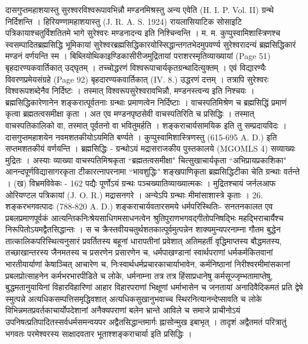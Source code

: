 दासगुप्तमहाशयास्तु सुरश्वरविश्वरूपावभिन्नौ मण्डनमिश्रस्तु अन्य एवेति (H. I. P. Vol. II) ग्रन्थे निर्दिशन्ति । हिरियण्णामहाशयास्तु (J. R. A. S. 1924) रायलासियाटिक सोसाइटि पत्रिकायाश्चतुर्विशतितमे भागे सुरेश्वरः मण्डनादन्य इति निश्चिन्वन्ति । म. म. कुप्पुस्वामिशास्त्रिणश्च स्वसम्पादितब्रह्मसिद्धि भूमिकायां सुरेश्वरब्रह्मसिद्धिकारयोस्सिद्धान्तगतभेदमुपवर्ण्य सुरेश्वरादन्यं ब्रह्मसिद्धिकारं मण्डनं वर्णयन्ति स्म ।
बिब्लियोथिकाइण्डिकासीरीजमुद्रितायां पराशरस्मृतिव्याख्यायां (Page 51) बृहदारण्यकवार्तिकात् उद्घृतम् । तच्चोद्धरणं विश्वरूपाचार्यकृतग्रन्थादित्युक्तम् । एवं विद्यारण्यैः विवरणप्रमेयसंग्रहे (Page 92) बृहदारण्यकवार्तिकात् (IV. 8.) उद्धरणं दत्तम् । तत्रापि सुरेश्वरः विश्वरूपशब्देनैव निर्दिष्टः । तस्मात् विश्वरूपसुरेश्वरावभिन्नौ, मण्डनस्त्वन्य इति निश्चयः ।
ब्रह्मसिद्धिकारेणानेन शङ्करात्पूर्वतनाः ग्रन्थाः प्रमाणत्वेन निर्दिष्टाः । वाचस्पतिमिश्रेण च ब्रह्मसिद्धिं प्रमाणं कृत्वा ब्रह्मतत्वसमीक्षा कृता । अत एव मण्डनपृष्ठसेवी वाचस्पतिरिति च प्रसिद्धिः । तस्मात् वाचस्पतिकालिको वा, तस्मात् पूर्वतनो वा भवितुमर्हति । शङ्कराचार्यसामयिक इति तु सम्प्रदायविदः । दासगुप्तमहाशयेन नवमशतकीयोऽयमिति बर्ण्यते । कुप्पुस्वामिशास्त्रिणस्तु (615-695 A. D.) इति सप्तमशतकीयं वर्णयन्ति ।
ब्रह्मसिद्धिः - ग्रन्थोऽयं मद्रासराजकीय पुस्तकालये (MGOMLS 4) सव्याख्यः मुद्रितः । अस्याः व्याख्या वाचस्पतिमिश्रकृता ``ब्रह्मतत्वसमीक्षा" चित्सुखाचार्यकृता ``अभिप्रायप्रकाशिका" आनन्दपूर्णविद्यासागरकृता टीकारत्नापरनामा ``भावशुद्धिः" शङ्खपाणिकृता ब्रह्मसिद्धिटीका चेति ग्रन्थाः वर्तन्ते ।
(ख) विभ्रमविवेकः - 162 पद्यैः पूर्णोऽयं ग्रन्थः पञ्चख्यातिव्याख्यात्मकः । मुद्रितश्चायं जर्नलआफ ओरियण्टल पत्रिकायां (J. O. R.) मद्रासनगरे । अन्येऽपि ग्रन्थाः मीमांसाशास्त्रे कृताः ।
26. शङ्करभगवत्पादः (788-820 A. D.)
शङ्कराचार्यवतारसमये धर्मपरिस्थितिः-
सनतनकालत एव प्रबलप्रमाणपूर्वकं आत्यन्तिकनिःश्रेयसाधिगमसाधनत्वेन श्रुतिपुराणभगवद्गीतोपनिषद्भिः महद्भिराचार्यैश्च निरूपितोऽयमद्वैतसिद्धान्तः । स च क्रैस्तवीयचतुर्थशतकात्पूर्वमुत्पन्नेन शाक्यमुन्यपरनाम्ना गौतम बुद्धेन तात्कालिकपरिस्थित्यनुसारं प्रवर्तितस्य बहूनां धारापतीनां प्रवेशात् अतिमहर्ती वृद्धिमाप्तस्य बौद्धमतस्य, तच्छाखान्तरस्य जैनमतस्य च प्रसरणेन प्रसारणेन च, धर्मपाखण्डानां स्वार्थपराणां धर्मकर्मकितवानां भारतीयार्याणां केषाञ्चित् आचारेण च, निःस्वार्थधर्मप्रचारकाचार्याभावेन, कर्मनिष्ठानां निरीश्वरमीमांसकानां प्रबलप्रोत्साहनेन कर्मभरभारपीडिते च लोके, धर्मनाम्ना तत्र तत्र हिंसाप्रधानेषु कर्मसूज्जृम्भतामाप्तेषु, बुद्धमतानुयायिनां विहारविहारिणां आहार विहारपराणां भिक्षूणां धर्माभासेन च जनतायां अनादिवैदिकमतं प्रति द्वेषे स्मुत्पन्ने अत्यधिकसम्पत्तिसमृद्धिवशात् अत्यधिकसुखानुभवाच्च स्थिरनित्यानन्देप्सावति च लोके विभिन्नमतप्रवर्तकाचार्योपदेशानां अनैक्यपराणां बलेन भ्रान्ते आविले च समाजे प्राचीनोऽयं उपनिषत्प्रतिपादितस्सर्वधर्मसमन्वयपर अद्वैतसिद्धान्तमार्गः ह्नासोन्मुख इबाभृत् । तादृशं अद्वैतमतं परित्रातुं भगवतः परमेश्वरस्य साक्षादवतार भूताश्शङ्कराचार्या इति प्रसिद्धिः ।
